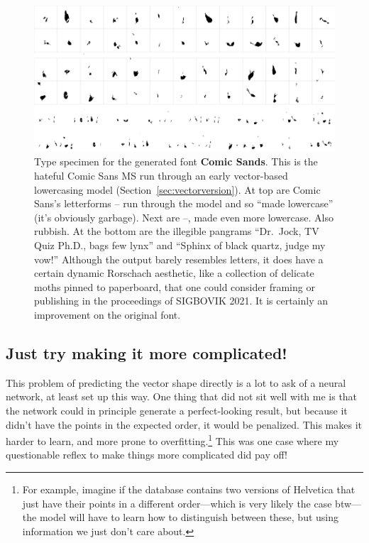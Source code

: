 \documentclass[twocolumn]{article} %
\begin{document}
\begin{figure}[tp]
\centering
  \includegraphics[width=0.95 \linewidth]{comicsands}
\caption{
  Type specimen for the generated font {\bf Comic Sands}. This is
  the hateful Comic Sans MS run through an early vector-based lowercasing
  model (Section~\ref{sec:vectorversion}). At top are Comic Sans's letterforms
  -- run through the model and so ``made
  lowercase'' (it's obviously garbage). Next are
  --,
  made even more lowercase. Also rubbish.
  At the bottom are the illegible pangrams
  ``Dr.~Jock, TV Quiz Ph.D., bags few lynx''
  and ``Sphinx of black quartz, judge my vow!'' Although the output
  barely resembles letters, it does have a certain dynamic
  Rorschach aesthetic, like a collection of delicate moths pinned
  to paperboard, that one could consider framing or publishing in
  the proceedings of SIGBOVIK 2021. It is certainly an improvement on
  the original font.
} \label{fig:comicsands}
\end{figure}


\subsection{Just try making it more complicated!} \label{sec:complicated}

This problem of predicting the vector shape directly is a lot to ask
of a neural network, at least set up this way. One thing that did not
sit well with me is that the network could in principle generate a
perfect-looking result, but because it didn't have the points in the
expected order, it would be penalized. This makes it harder to learn,
and more prone to overfitting.\footnote{For example, imagine if the database
contains two versions of Helvetica that just have their points in a
different order---which is very likely the case btw---the model will
have to learn how to distinguish between these, but using information
we just don't care about.} This was one case where my questionable
reflex to make things more complicated did pay off!
\end{document}
